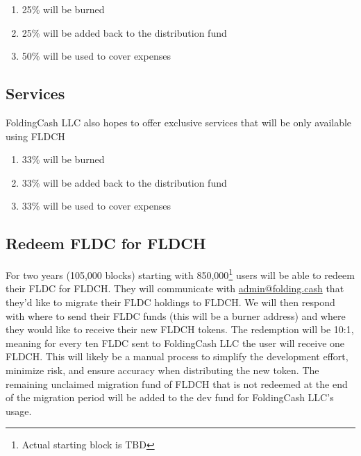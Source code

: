 \documentclass[letterpaper,12pt,titlepage]{article}
\makeatletter
\def\adminEmail{\href{mailto:admin@folding.cash}{admin@folding.cash}}
\def\org{FoldingCash LLC}
\def\ticker{FLDCH}
\def\startingBlock{850,000\footnote{Actual starting block is TBD}}
\makeatother
\begin{document}
\begin{enumerate}
    \item 25\% will be burned
    \item 25\% will be added back to the distribution fund
    \item 50\% will be used to cover expenses
\end{enumerate}

\subsection{Services}
\org{} also hopes to offer exclusive services that will be only available using \ticker{}

\begin{enumerate}
    \item 33\% will be burned
    \item 33\% will be added back to the distribution fund
    \item 33\% will be used to cover expenses
\end{enumerate}

\subsection{Redeem FLDC for FLDCH}
For two years (105,000 blocks) starting with \startingBlock{} users will be able to redeem their FLDC for \ticker{}. They will communicate with \adminEmail{} that they'd like to migrate their FLDC holdings to \ticker{}. We will then respond with where to send their FLDC funds (this will be a burner address) and where they would like to receive their new \ticker{} tokens. The redemption will be 10:1, meaning for every ten FLDC sent to \org{} the user will receive one \ticker{}. This will likely be a manual process to simplify the development effort, minimize risk, and ensure accuracy when distributing the new token. The remaining unclaimed migration fund of \ticker{} that is not redeemed at the end of the migration period will be added to the dev fund for \org{'s} usage.
\end{document}
